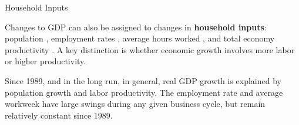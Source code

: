 \begin{minipage}{0.76\textwidth} 
\normalsize Household Inputs
\vspace{-1mm}

\small Changes to GDP can also be assigned to changes in \textbf{household inputs}: population , employment rates , average hours worked , and total economy productivity . A key distinction is whether economic growth involves more labor or higher productivity. 

Since 1989, and in the long run, in general, real GDP growth is explained by population growth and labor productivity. The employment rate and average workweek have large swings during any given business cycle, but remain relatively constant since 1989. 


\vspace{1mm}

\vspace{4.0cm}


\end{minipage}

